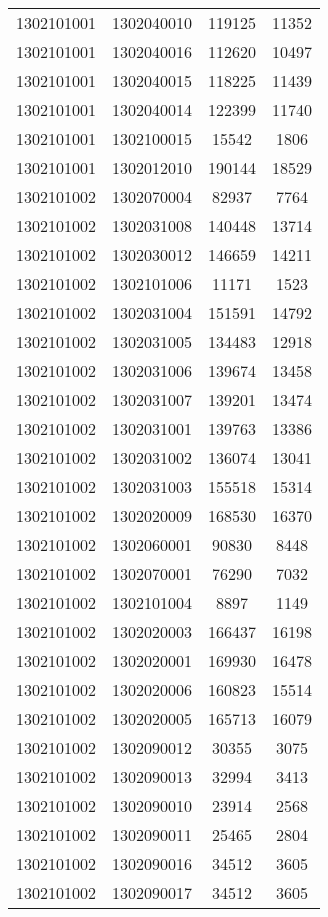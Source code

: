 \begin{longtable}[h]{llcc}
		1302101001 & 1302040010 & 119125 & 11352\\
		1302101001 & 1302040016 & 112620 & 10497\\
		1302101001 & 1302040015 & 118225 & 11439\\
		1302101001 & 1302040014 & 122399 & 11740\\
		1302101001 & 1302100015 & 15542 & 1806\\
		1302101001 & 1302012010 & 190144 & 18529\\
		1302101002 & 1302070004 & 82937 & 7764\\
		1302101002 & 1302031008 & 140448 & 13714\\
		1302101002 & 1302030012 & 146659 & 14211\\
		1302101002 & 1302101006 & 11171 & 1523\\
		1302101002 & 1302031004 & 151591 & 14792\\
		1302101002 & 1302031005 & 134483 & 12918\\
		1302101002 & 1302031006 & 139674 & 13458\\
		1302101002 & 1302031007 & 139201 & 13474\\
		1302101002 & 1302031001 & 139763 & 13386\\
		1302101002 & 1302031002 & 136074 & 13041\\
		1302101002 & 1302031003 & 155518 & 15314\\
		1302101002 & 1302020009 & 168530 & 16370\\
		1302101002 & 1302060001 & 90830 & 8448\\
		1302101002 & 1302070001 & 76290 & 7032\\
		1302101002 & 1302101004 & 8897 & 1149\\
		1302101002 & 1302020003 & 166437 & 16198\\
		1302101002 & 1302020001 & 169930 & 16478\\
		1302101002 & 1302020006 & 160823 & 15514\\
		1302101002 & 1302020005 & 165713 & 16079\\
		1302101002 & 1302090012 & 30355 & 3075\\
		1302101002 & 1302090013 & 32994 & 3413\\
		1302101002 & 1302090010 & 23914 & 2568\\
		1302101002 & 1302090011 & 25465 & 2804\\
		1302101002 & 1302090016 & 34512 & 3605\\
		1302101002 & 1302090017 & 34512 & 3605\\

\end{longtable}

